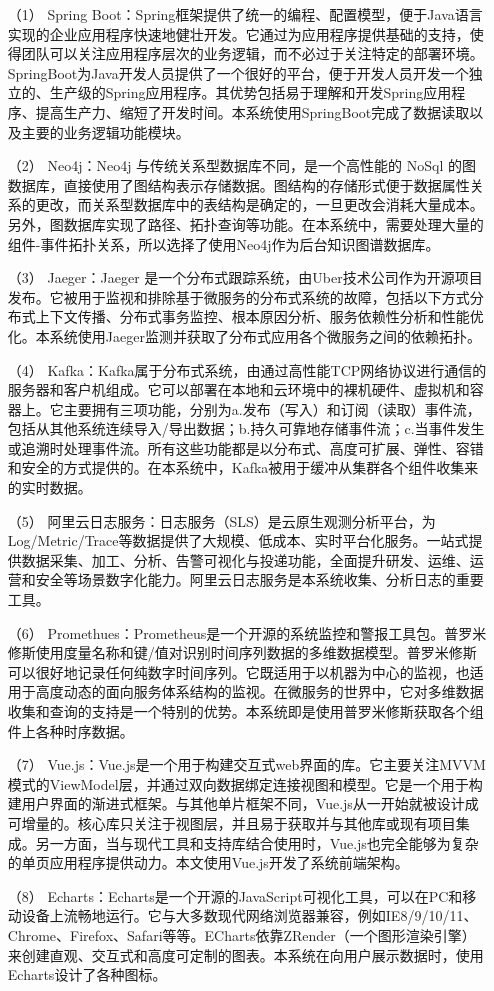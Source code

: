 \begin{itemize}
    \item [（1）]Spring Boot：Spring框架提供了统一的编程、配置模型，便于Java语言实现的企业应用程序快速地健壮开发。它通过为应用程序提供基础的支持，使得团队可以关注应用程序层次的业务逻辑，而不必过于关注特定的部署环境。SpringBoot为Java开发人员提供了一个很好的平台，便于开发人员开发一个独立的、生产级的Spring应用程序。其优势包括易于理解和开发Spring应用程序、提高生产力、缩短了开发时间。本系统使用SpringBoot完成了数据读取以及主要的业务逻辑功能模块。
    \item [（2）]Neo4j：Neo4j 与传统关系型数据库不同，是一个高性能的 NoSql 的图数据库，直接使用了图结构表示存储数据。图结构的存储形式便于数据属性关系的更改，而关系型数据库中的表结构是确定的，一旦更改会消耗大量成本。另外，图数据库实现了路径、拓扑查询等功能。在本系统中，需要处理大量的组件-事件拓扑关系，所以选择了使用Neo4j作为后台知识图谱数据库。
    \item [（3）]Jaeger：Jaeger 是一个分布式跟踪系统，由Uber技术公司作为开源项目发布。它被用于监视和排除基于微服务的分布式系统的故障，包括以下方式分布式上下文传播、分布式事务监控、根本原因分析、服务依赖性分析和性能优化。本系统使用Jaeger监测并获取了分布式应用各个微服务之间的依赖拓扑。
    \item [（4）]Kafka：Kafka属于分布式系统，由通过高性能TCP网络协议进行通信的服务器和客户机组成。它可以部署在本地和云环境中的裸机硬件、虚拟机和容器上。它主要拥有三项功能，分别为a.发布（写入）和订阅（读取）事件流，包括从其他系统连续导入/导出数据；b.持久可靠地存储事件流；c.当事件发生或追溯时处理事件流。所有这些功能都是以分布式、高度可扩展、弹性、容错和安全的方式提供的。在本系统中，Kafka被用于缓冲从集群各个组件收集来的实时数据。
    \item [（5）]阿里云日志服务：日志服务（SLS）是云原生观测分析平台，为Log/Metric/Trace等数据提供了大规模、低成本、实时平台化服务。一站式提供数据采集、加工、分析、告警可视化与投递功能，全面提升研发、运维、运营和安全等场景数字化能力。阿里云日志服务是本系统收集、分析日志的重要工具。
    \item [（6）]Promethues：Prometheus是一个开源的系统监控和警报工具包。普罗米修斯使用度量名称和键/值对识别时间序列数据的多维数据模型。普罗米修斯可以很好地记录任何纯数字时间序列。它既适用于以机器为中心的监视，也适用于高度动态的面向服务体系结构的监视。在微服务的世界中，它对多维数据收集和查询的支持是一个特别的优势。本系统即是使用普罗米修斯获取各个组件上各种时序数据。
    \item [（7）]Vue.js：Vue.js是一个用于构建交互式web界面的库。它主要关注MVVM模式的ViewModel层，并通过双向数据绑定连接视图和模型。它是一个用于构建用户界面的渐进式框架。与其他单片框架不同，Vue.js从一开始就被设计成可增量的。核心库只关注于视图层，并且易于获取并与其他库或现有项目集成。另一方面，当与现代工具和支持库结合使用时，Vue.js也完全能够为复杂的单页应用程序提供动力。本文使用Vue.js开发了系统前端架构。
    \item [（8）]Echarts：Echarts是一个开源的JavaScript可视化工具，可以在PC和移动设备上流畅地运行。它与大多数现代网络浏览器兼容，例如IE8/9/10/11、Chrome、Firefox、Safari等等。ECharts依靠ZRender（一个图形渲染引擎）来创建直观、交互式和高度可定制的图表。本系统在向用户展示数据时，使用Echarts设计了各种图标。
\end{itemize}

